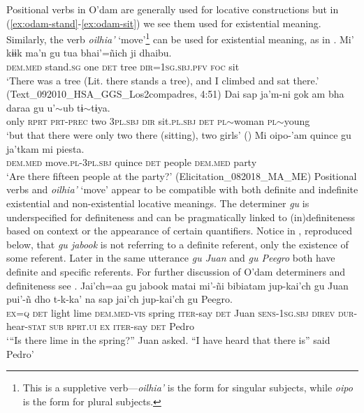 \documentclass[output=paper,draft,draftmode,colorlinks,citecolor=brown]{langscibook}
\begin{document}
Positional verbs in O’dam are generally used for locative constructions \citep{garcia2017} but in (\ref{ex:odam-stand}-\ref{ex:odam-sit}) we see them used for existential meaning. Similarly, the verb \emph{oilhia’} ‘move’\footnote{This is a suppletive verb---\emph{oilhia’} is the form for singular subjects, while \emph{oipo} is the form for plural subjects.} can be used for existential meaning, as in .
\ea
\label{ex:odam-stand}
\gll Mi’	kɨɨk		ma’n 	gu 	tua 	bhai’=ñich		 ji 	dhaibu.\\
\textsc{dem.med}	stand.\textsc{sg}	one 	\textsc{det} 	tree 	\textsc{dir=1sg.sbj.pfv} 	\textsc{foc} 	sit\\
\glt ‘There was a tree (Lit. there stands a tree), and I climbed and sat there.’ (Text\_092010\_HSA\_GGS\_Los2compadres, 4:51)
\z 
\ea
\label{ex:odam-sit}
\gll Dai	sap	ja'm-ni 		gok 	am 		bha 	daraa gu 	u'$\sim$ub        		tɨ$\sim$tɨya.\\
only	\textsc{rprt} 	\textsc{prt-prec} 		two	3\textsc{pl.sbj} 	\textsc{dir} 	sit.\textsc{pl.sbj}  \textsc{det} 	\textsc{pl}$\sim$woman 	\textsc{pl}$\sim$young\\
\glt ‘but that there were only two there (sitting), two girls’ (\citealt{garciaeinrev})
\z 
\ea
\label{ex:odam-move}
\gll Mi 	oipo-’am 		quince gu	ja’tkam	mi 	piesta.\\
	\textsc{dem.med}	move.\textsc{pl-3pl.sbj}	quince	\textsc{det}	people		\textsc{dem.med}	party\\
\glt ‘Are there fifteen people at the party?’ (Elicitation\_082018\_MA\_ME)
\z 
Positional verbs and \emph{oilhia’} ‘move’ appear to be 
compatible with both definite and indefinite existential and 
non-existential locative meanings. The determiner \emph{gu} is
underspecified for definiteness and can be pragmatically 
linked to (in)def\-i\-nite\-ness based on context or the appearance
of certain quantifiers. Notice in , reproduced below, that \emph{gu 
jabook} is not referring to a definite referent, only the 
existence of some referent. Later in the same utterance 
\emph{gu Juan} and \emph{gu Peegro} both have definite and 
specific referents. For further discussion of O'dam 
determiners and definiteness see \citet[25--28]{everdell2018}.
\ea
\gll Jai’ch=aa	gu	jabook	matai	mi’-ñi		bibiatam jup-kai’ch	gu	Juan pui’-ñ			dho		t{\ɇ}-k{\ɇ}{\ɇ}-ka’		na	sap		jai’ch jup-kai’ch	gu	Peegro.\\
\textsc{ex=q}	\textsc{det}	light	lime	\textsc{dem.med-vis}	spring \textsc{iter}-say		\textsc{det}	Juan \textsc{sens-1sg.sbj}	\textsc{direv}	\textsc{dur}-hear-\textsc{stat}	\textsc{sub}	\textsc{rprt.ui}	\textsc{ex} \textsc{iter}-say		\textsc{det}	Pedro\\
\glt ‘“Is there lime in the spring?” Juan asked. “I have heard that there is” said Pedro’ \citep[76]{willettw2015}
\z 
\end{document}
